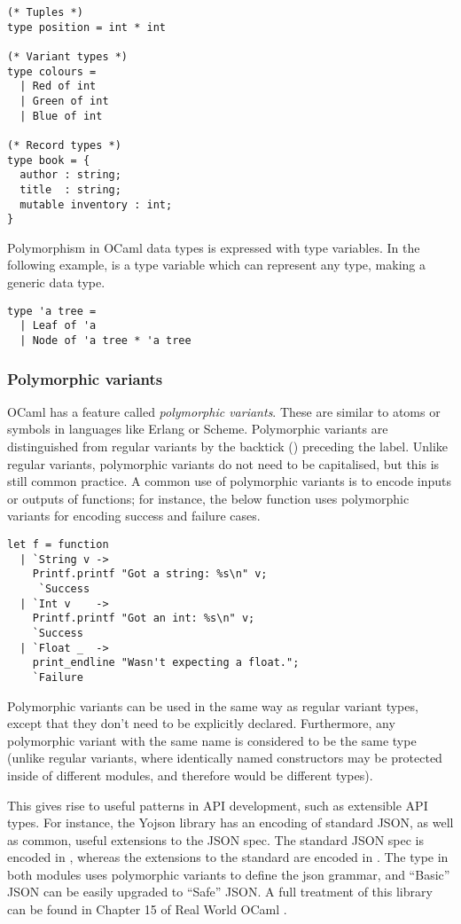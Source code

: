 \begin{lstlisting}
(* Tuples *)
type position = int * int

(* Variant types *)
type colours =
  | Red of int
  | Green of int
  | Blue of int

(* Record types *)
type book = {
  author : string;
  title  : string;
  mutable inventory : int;
}
\end{lstlisting}


Polymorphism in OCaml data types is expressed with type variables. In
the following example,  is a type variable which can
represent any type, making  a generic data type.

\begin{lstlisting}
type 'a tree =
  | Leaf of 'a
  | Node of 'a tree * 'a tree
\end{lstlisting}

\subsubsection{Polymorphic variants}

OCaml has a feature called \emph{polymorphic variants}. These are
similar to atoms or symbols in languages like Erlang or
Scheme. Polymorphic variants are distinguished from regular variants
by the backtick () preceding the label. Unlike regular
variants, polymorphic variants do not need to be capitalised, but this
is still common practice. A common use of polymorphic variants is to
encode inputs or outputs of functions; for instance, the below
function uses polymorphic variants for encoding success and failure
cases.

\begin{lstlisting}
let f = function
  | `String v ->
    Printf.printf "Got a string: %s\n" v;
     `Success
  | `Int v    ->
    Printf.printf "Got an int: %s\n" v;
    `Success
  | `Float _  ->
    print_endline "Wasn't expecting a float.";
    `Failure
\end{lstlisting}

Polymorphic variants can be used in the same way as regular variant
types, except that they don't need to be explicitly
declared. Furthermore, any polymorphic variant with the same name is
considered to be the same type (unlike regular variants, where
identically named constructors may be protected inside of different
modules, and therefore would be different types).

This gives rise to useful patterns in API development, such as
extensible API types. For instance, the Yojson library has an encoding
of standard JSON, as well as common, useful extensions to the JSON
spec. The standard JSON spec is encoded in ,
whereas the extensions to the standard are encoded in
. The  type in both modules uses
polymorphic variants to define the json grammar, and ``Basic'' JSON
can be easily upgraded to ``Safe'' JSON. A full treatment of this
library can be found in Chapter 15 of Real World OCaml \cite{rwo}.

